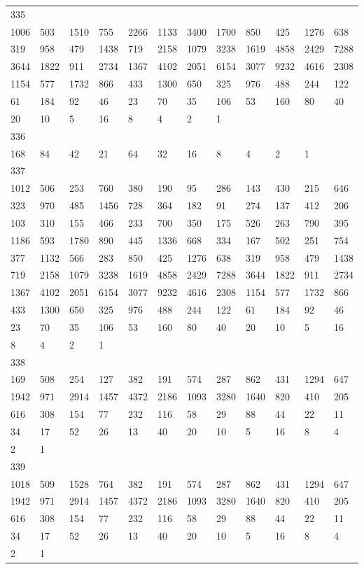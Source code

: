 \begin{longtable}{llllllllllll}
335&&&&&&&&&&&\\
1006& 503& 1510& 755& 2266& 1133& 3400& 1700& 850& 425& 1276& 638\\
319& 958& 479& 1438& 719& 2158& 1079& 3238& 1619& 4858& 2429& 7288\\
3644& 1822& 911& 2734& 1367& 4102& 2051& 6154& 3077& 9232& 4616& 2308\\
1154& 577& 1732& 866& 433& 1300& 650& 325& 976& 488& 244& 122\\
61& 184& 92& 46& 23& 70& 35& 106& 53& 160& 80& 40\\
20& 10& 5& 16& 8& 4& 2& 1& \\

336&&&&&&&&&&&\\
168& 84& 42& 21& 64& 32& 16& 8& 4& 2& 1& \\

337&&&&&&&&&&&\\
1012& 506& 253& 760& 380& 190& 95& 286& 143& 430& 215& 646\\
323& 970& 485& 1456& 728& 364& 182& 91& 274& 137& 412& 206\\
103& 310& 155& 466& 233& 700& 350& 175& 526& 263& 790& 395\\
1186& 593& 1780& 890& 445& 1336& 668& 334& 167& 502& 251& 754\\
377& 1132& 566& 283& 850& 425& 1276& 638& 319& 958& 479& 1438\\
719& 2158& 1079& 3238& 1619& 4858& 2429& 7288& 3644& 1822& 911& 2734\\
1367& 4102& 2051& 6154& 3077& 9232& 4616& 2308& 1154& 577& 1732& 866\\
433& 1300& 650& 325& 976& 488& 244& 122& 61& 184& 92& 46\\
23& 70& 35& 106& 53& 160& 80& 40& 20& 10& 5& 16\\
8& 4& 2& 1& \\

338&&&&&&&&&&&\\
169& 508& 254& 127& 382& 191& 574& 287& 862& 431& 1294& 647\\
1942& 971& 2914& 1457& 4372& 2186& 1093& 3280& 1640& 820& 410& 205\\
616& 308& 154& 77& 232& 116& 58& 29& 88& 44& 22& 11\\
34& 17& 52& 26& 13& 40& 20& 10& 5& 16& 8& 4\\
2& 1& \\

339&&&&&&&&&&&\\
1018& 509& 1528& 764& 382& 191& 574& 287& 862& 431& 1294& 647\\
1942& 971& 2914& 1457& 4372& 2186& 1093& 3280& 1640& 820& 410& 205\\
616& 308& 154& 77& 232& 116& 58& 29& 88& 44& 22& 11\\
34& 17& 52& 26& 13& 40& 20& 10& 5& 16& 8& 4\\
2& 1& \\


\end{longtable}
